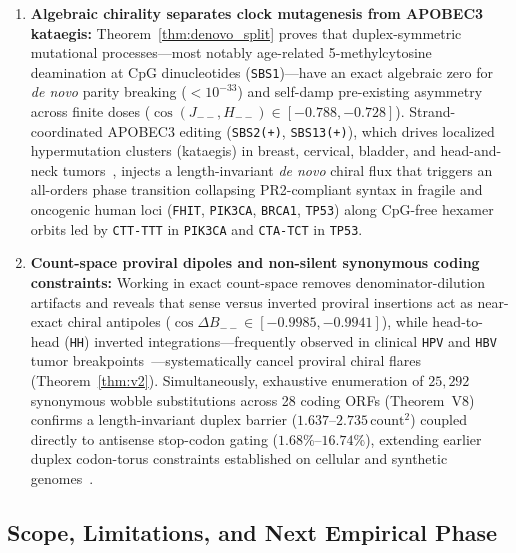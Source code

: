\documentclass[11pt, a4paper]{article}
\DeclareRobustCommand{\_}{\textunderscore\allowbreak}
\begin{document}
\begin{enumerate}
    \item \textbf{Algebraic chirality separates clock mutagenesis from APOBEC3 kataegis:} Theorem~\ref{thm:denovo_split} proves that duplex-symmetric mutational processes---most notably age-related 5-methylcytosine deamination at $\mathrm{CpG}$ dinucleotides (\texttt{SBS1})---have an exact algebraic zero for \textit{de novo} parity breaking ($< 10^{-33}$) and self-damp pre-existing asymmetry across finite doses ($\cos(J_{--}, H_{--}) \in [-0.788, -0.728]$). Strand-coordinated APOBEC3 editing (\texttt{SBS2(+)}, \texttt{SBS13(+)}), which drives localized hypermutation clusters (kataegis) in breast, cervical, bladder, and head-and-neck tumors~\cite{nikzainal2012,roberts2013}, injects a length-invariant \textit{de novo} chiral flux that triggers an all-orders phase transition collapsing PR2-compliant syntax in fragile and oncogenic human loci (\texttt{FHIT}, \texttt{PIK3CA}, \texttt{BRCA1}, \texttt{TP53}) along CpG-free hexamer orbits led by \texttt{CTT-TTT} in \texttt{PIK3CA} and \texttt{CTA-TCT} in \texttt{TP53}.
    \item \textbf{Count-space proviral dipoles and non-silent synonymous coding constraints:} Working in exact count-space removes denominator-dilution artifacts and reveals that sense versus inverted proviral insertions act as near-exact chiral antipoles ($\cos \Delta B_{--} \in [-0.9985, -0.9941]$), while head-to-head (\texttt{HH}) inverted integrations---frequently observed in clinical \texttt{HPV} and \texttt{HBV} tumor breakpoints~\cite{sung2012,akagi2014}---systematically cancel proviral chiral flares (Theorem~\ref{thm:v2}). Simultaneously, exhaustive enumeration of $25,292$ synonymous wobble substitutions across 28 coding ORFs (Theorem~V8) confirms a length-invariant duplex barrier ($1.637\text{--}2.735\,\mathrm{count}^2$) coupled directly to antisense stop-codon gating ($1.68\%\text{--}16.74\%$), extending earlier duplex codon-torus constraints established on cellular and synthetic genomes~\cite{logvinovich2026_form,logvinovich2026_duplex,logvinovich2026_t2t}.
\end{enumerate}

\subsection{Scope, Limitations, and Next Empirical Phase}
\end{document}
